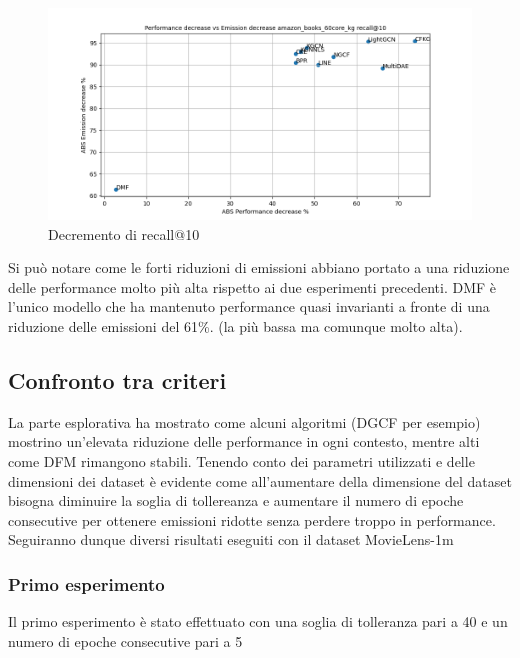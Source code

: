 \begin{figure}[H]
    \centering
    \includegraphics[scale=0.5]{images/decrement_recall@10_amazon_books_60core_kg.png}
    \caption{Decremento di recall@10}
\end{figure}
\noindent Si può notare come le forti riduzioni di emissioni abbiano portato a una riduzione delle performance molto più alta rispetto ai due esperimenti precedenti.
DMF è l'unico modello che ha mantenuto performance quasi invarianti a fronte di una riduzione delle emissioni del 61\%. (la più bassa ma comunque molto alta).
    

\subsection{Confronto tra criteri}
La parte esplorativa ha mostrato come alcuni algoritmi (DGCF per esempio) mostrino un'elevata riduzione delle performance in ogni contesto, mentre alti come DFM rimangono stabili.
Tenendo conto dei parametri utilizzati e delle dimensioni dei dataset è evidente come all'aumentare della dimensione del dataset bisogna diminuire la soglia di tollereanza e aumentare il numero di epoche consecutive per ottenere emissioni ridotte senza perdere troppo in performance.
Seguiranno dunque diversi risultati eseguiti con il dataset MovieLens-1m

\subsubsection{Primo esperimento}
Il primo esperimento è stato effettuato con una soglia di tolleranza pari a 40 e un numero di epoche consecutive pari a 5

